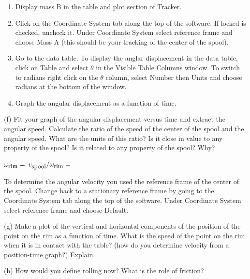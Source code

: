 \begin{enumerate}
\item Display mass B in the table and plot section of Tracker. 

\item Click on the Coordinate System tab along the top of the software.  If locked is checked, uncheck it. Under Coordinate System select reference frame and choose Mass A (this should be your tracking of the center of the spool).

\item Go to the data table. To display the anglar displacement in the data table, click on Table and select \( \theta \) in the Visible Table Columns window. To switch to radians right click on the \( \theta \) column, select Number then Units and choose radians at the bottom of the window.

\item Graph the angular displacement as a function of time.
\end{enumerate}

(f) Fit your graph of the angular displacement versus time and extract the angular
speed. Calculate the ratio of the speed of the center of the spool and the angular
speed. What are the units of this ratio? Is it close in value to any property
of the spool? Is it related to any property of the spool? Why?
\vspace{5mm}

\( \omega _{\mbox{\small rim}}= \)\hfill{} \( v_{\mbox{\small spool}}/
\omega _{\mbox{\small rim}}= \)\hfill{}
\vspace{10mm}

To determine the angular velocity you used the reference frame of the center of the spool.  Change back to a stationary reference frame by going to the Coordinate System tab along the top of the software.  Under Coordinate System select reference frame and choose Default.

(g) Make a plot of the vertical and horizontal components of the position of
the point on the rim as a function of time.  What is the speed of the point on the rim when it is in contact with the
table? (how do you determine velocity from a position-time graph?) Explain.
\vspace{20mm}

(h) How would you define rolling now? What is the role of friction?

